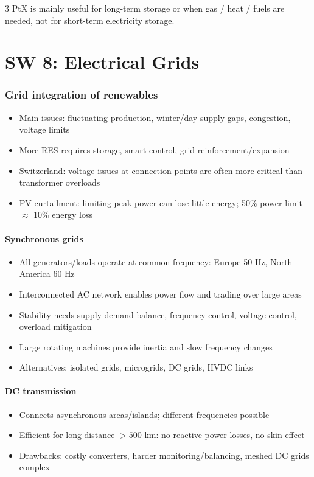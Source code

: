 \documentclass[9pt, landscape, a4paper]{article}
\begin{document}
\begin{multicols*}{3}
PtX is mainly useful for long-term storage or when gas / heat / fuels are needed, not
for short-term electricity storage.

\newcolumn
\vspace*{-.5cm}
\part{SW 8: Electrical Grids}

\section{Grid integration of renewables}
\begin{itemize}
  \item Main issues: fluctuating production, winter/day supply gaps, congestion, voltage limits
  \item More RES requires storage, smart control, grid reinforcement/expansion
  \item Switzerland: voltage issues at connection points are often more critical than transformer overloads
  \item PV curtailment: limiting peak power can lose little energy; 50\% power limit $\approx$ 10\% energy loss
\end{itemize}

\subsection{Synchronous grids}
\begin{itemize}
  \item All generators/loads operate at common frequency: Europe 50 Hz, North America 60 Hz
  \item Interconnected AC network enables power flow and trading over large areas
  \item Stability needs supply-demand balance, frequency control, voltage control, overload mitigation
  \item Large rotating machines provide inertia and slow frequency changes
  \item Alternatives: isolated grids, microgrids, DC grids, HVDC links
\end{itemize}

\subsection{DC transmission}
\begin{itemize}
  \item Connects asynchronous areas/islands; different frequencies possible
  \item Efficient for long distance $>500$ km: no reactive power losses, no skin effect
  \item Drawbacks: costly converters, harder monitoring/balancing, meshed DC grids complex
\end{itemize}


\end{multicols*}
\end{document}

